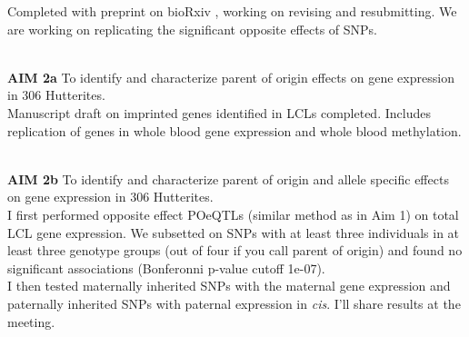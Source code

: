 \documentclass[a4paper, 11pt]{article}
\begin{document}
	Completed with preprint on bioRxiv \cite{Mozaffari:dg}, working on revising and resubmitting. We are working on replicating the significant opposite effects of SNPs.
	
 \textbf{\\AIM 2a} To identify and characterize parent of origin effects on gene expression in 306 Hutterites.\\
 
 	Manuscript draft on imprinted genes identified in LCLs completed. Includes replication of genes in whole blood gene expression and whole blood methylation. 
 
 \textbf{\\AIM 2b} To identify and characterize parent of origin and allele specific effects on gene expression in 306 Hutterites.\\ 
 	
	I first performed opposite effect POeQTLs (similar method as in Aim 1) on total LCL gene expression. We subsetted on SNPs with at least three individuals in at least three genotype groups (out of four if you call parent of origin) and found no significant associations (Bonferonni p-value cutoff 1e-07).\\
	
	I then tested maternally inherited SNPs with the maternal gene expression and paternally inherited SNPs with paternal expression in \textit{cis}. I'll share results at the meeting. \\
	





\end{document}
